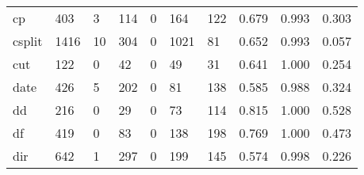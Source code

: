 \begin{longtable}{lp{2.0cm}p{2.0cm}p{2.0cm}p{2.0cm}p{2.0cm}p{2.0cm}p{2.0cm}p{2.0cm}p{2.0cm}}
cp        &                    403 &                                  3 &                               114 &                                0 &                               164 &                             122 &                                0.679 &                                  0.993 &                                0.303 \\
csplit    &                   1416 &                                 10 &                               304 &                                0 &                              1021 &                              81 &                                0.652 &                                  0.993 &                                0.057 \\
cut       &                    122 &                                  0 &                                42 &                                0 &                                49 &                              31 &                                0.641 &                                  1.000 &                                0.254 \\
date      &                    426 &                                  5 &                               202 &                                0 &                                81 &                             138 &                                0.585 &                                  0.988 &                                0.324 \\
dd        &                    216 &                                  0 &                                29 &                                0 &                                73 &                             114 &                                0.815 &                                  1.000 &                                0.528 \\
df        &                    419 &                                  0 &                                83 &                                0 &                               138 &                             198 &                                0.769 &                                  1.000 &                                0.473 \\
dir       &                    642 &                                  1 &                               297 &                                0 &                               199 &                             145 &                                0.574 &                                  0.998 &                                0.226 \\

\end{longtable}
